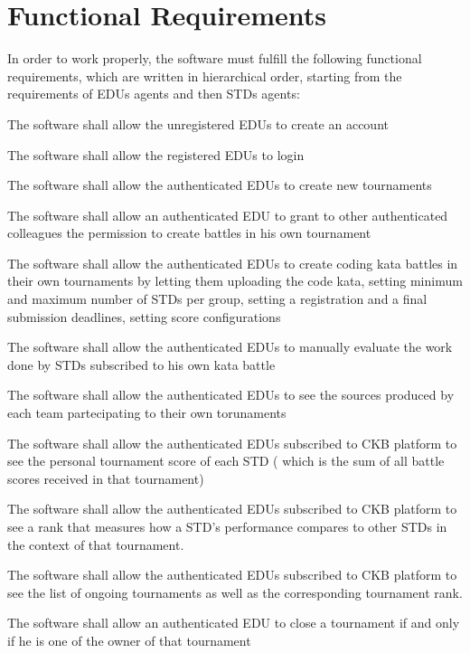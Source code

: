 \section{Functional Requirements}
In order to work properly, the software must fulfill the following functional requirements, which are written in hierarchical order, starting from the requirements of EDUs agents and then STDs agents:
    \begin{requirementsenumerate}
        \item The software shall allow the unregistered EDUs to create an account 
        \item The software shall allow the registered EDUs to login
        \item The software shall allow the authenticated EDUs to create new tournaments
        \item The software shall allow an authenticated EDU to grant to other authenticated colleagues the permission to create battles in his own tournament
        \item The software shall allow the authenticated EDUs to create coding kata battles in their own tournaments by letting them uploading the code kata, setting minimum and maximum number of STDs per group, setting a registration and a final submission deadlines, setting score configurations
        \item The software shall allow the authenticated EDUs to manually evaluate the work done by STDs subscribed to his own kata battle
        \item The software shall allow the authenticated EDUs to see the sources produced by each team partecipating to their own torunaments
        \item The software shall allow the authenticated EDUs subscribed to CKB platform to see the personal tournament score of each STD ( which is the sum of all battle scores received in that tournament)
        \item The software shall allow the authenticated EDUs subscribed to CKB platform to see a rank that measures how a STD's performance compares to other STDs in the context of that tournament. 
        \item The software shall allow the authenticated EDUs subscribed to CKB platform to see the list of ongoing tournaments as well as the corresponding tournament rank.  
        \item The software shall allow an authenticated EDU to close a tournament if and only if he is one of the owner of that tournament

\end{requirementsenumerate}

